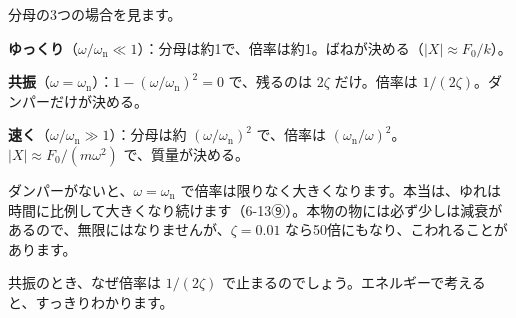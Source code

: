 \begin{phyomi}[倍率の式]
分母の3つの場合を見ます。\par
\textbf{ゆっくり}（$\omega/\omega_{\mathrm n}\ll1$）：分母は約1で、倍率は約1。ばねが決める（$\lvert X\rvert\approx F_0/k$）。\par
\textbf{共振}（$\omega=\omega_{\mathrm n}$）：$1-(\omega/\omega_{\mathrm n})^2=0$ で、残るのは $2\zeta$ だけ。倍率は $1/(2\zeta)$。ダンパーだけが決める。\par
\textbf{速く}（$\omega/\omega_{\mathrm n}\gg1$）：分母は約 $(\omega/\omega_{\mathrm n})^2$ で、倍率は $(\omega_{\mathrm n}/\omega)^2$。$\lvert X\rvert\approx F_0/(m\omega^2)$ で、質量が決める。
\end{phyomi}

\begin{phflow}[強制振動]
\end{phflow}
ダンパーがないと、$\omega=\omega_{\mathrm n}$ で倍率は限りなく大きくなります。本当は、ゆれは時間に比例して大きくなり続けます（6-13⑨）。本物の物には必ず少しは減衰があるので、無限にはなりませんが、$\zeta=0.01$ なら50倍にもなり、こわれることがあります。

\label{ph:波-2:sec5}
共振のとき、なぜ倍率は $1/(2\zeta)$ で止まるのでしょう。エネルギーで考えると、すっきりわかります。

